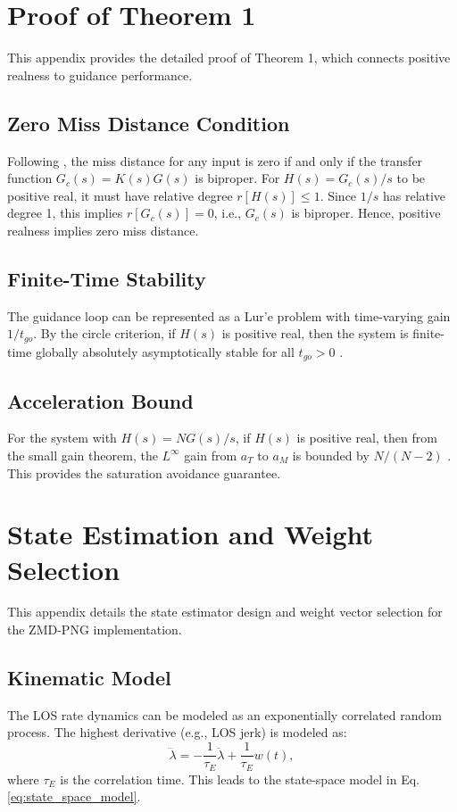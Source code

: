 \documentclass[11pt,a4paper]{article}
\begin{document}
\appendix
\section{Proof of Theorem 1}
\label{app:proof}
This appendix provides the detailed proof of Theorem 1, which connects positive realness to guidance performance.

\subsection{Zero Miss Distance Condition}
Following \cite{Gurfil1998_08}, the miss distance for any input is zero if and only if the transfer function $G_c(s) = K(s)G(s)$ is biproper. For $H(s) = G_c(s)/s$ to be positive real, it must have relative degree $r[H(s)] \leq 1$. Since $1/s$ has relative degree 1, this implies $r[G_c(s)] = 0$, i.e., $G_c(s)$ is biproper. Hence, positive realness implies zero miss distance.

\subsection{Finite-Time Stability}
The guidance loop can be represented as a Lur'e problem with time-varying gain $1/t_{go}$. By the circle criterion, if $H(s)$ is positive real, then the system is finite-time globally absolutely asymptotically stable for all $t_{go} > 0$ \cite{Gurfil1998_11}.

\subsection{Acceleration Bound}
For the system with $H(s) = NG(s)/s$, if $H(s)$ is positive real, then from the small gain theorem, the $L^\infty$ gain from $a_T$ to $a_M$ is bounded by $N/(N-2)$ \cite{Gurfil2003}. This provides the saturation avoidance guarantee.

\section{State Estimation and Weight Selection}
\label{app:estimation}
This appendix details the state estimator design and weight vector selection for the ZMD-PNG implementation.

\subsection{Kinematic Model}
The LOS rate dynamics can be modeled as an exponentially correlated random process. The highest derivative (e.g., LOS jerk) is modeled as:
\begin{equation}
\dddot{\lambda} = -\frac{1}{\tau_E} \ddot{\lambda} + \frac{1}{\tau_E} w(t),
\end{equation}
where $\tau_E$ is the correlation time. This leads to the state-space model in Eq. \eqref{eq:state_space_model}.
\end{document}
